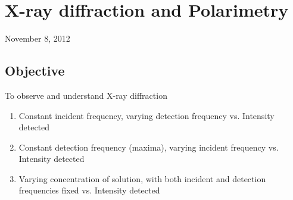 \chapter{X-ray diffraction and Polarimetry}
\begin{flushright}
November 8, 2012
\end{flushright}
\section{Objective}
To observe and understand X-ray diffraction
	\begin{enumerate}
		\item Constant incident frequency, varying detection frequency vs. Intensity detected
		\item Constant detection frequency (maxima), varying incident frequency vs. Intensity detected
		\item Varying concentration of solution, with both incident and detection frequencies fixed vs. Intensity detected
	\end{enumerate}

